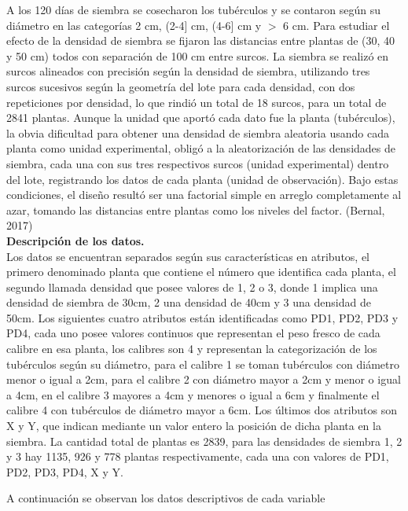 A los 120 días de siembra se cosecharon los tubérculos y se contaron según su diámetro en las categorías 2 cm, (2-4] cm, (4-6] cm y $>$ 6 cm. Para estudiar el efecto de la densidad de siembra se fijaron las distancias entre plantas de (30, 40 y 50 cm) todos con separación de 100 cm entre surcos. La siembra se realizó en surcos alineados con precisión según la densidad de siembra, utilizando tres surcos sucesivos según la geometría del lote para cada densidad, con dos repeticiones por densidad, lo que rindió un total de 18 surcos, para un total de 2841 plantas. Aunque la unidad que aportó cada dato fue la planta (tubérculos), la obvia dificultad para obtener una densidad de siembra aleatoria usando cada planta como unidad experimental, obligó a la aleatorización de las densidades de siembra, cada una con sus tres respectivos surcos (unidad experimental) dentro del lote, registrando los datos de cada planta (unidad de observación). Bajo estas condiciones, el diseño resultó ser una factorial simple en arreglo completamente al azar, tomando las distancias entre plantas como los niveles del factor. (Bernal, 2017)\\

\noindent
\textbf{Descripción de los datos.}\\

Los datos se encuentran separados según sus características en atributos, el primero denominado planta que contiene el número que identifica cada planta, el segundo llamada densidad que posee valores de 1, 2 o 3, donde 1 implica una densidad de siembra de 30cm, 2 una densidad de 40cm y 3 una densidad de 50cm. Los siguientes cuatro atributos están identificadas como PD1, PD2, PD3 y PD4, cada uno posee valores continuos que representan el peso fresco de cada calibre en esa planta, los calibres son 4 y representan la categorización de los tubérculos según su diámetro, para el calibre 1 se toman tubérculos con diámetro menor o igual a 2cm, para el calibre 2 con diámetro mayor a 2cm y menor o igual a 4cm, en el calibre 3 mayores a 4cm y menores o igual a 6cm y finalmente el calibre 4 con tubérculos de diámetro mayor a 6cm. Los últimos dos atributos son X y Y, que indican mediante un valor entero la posición de dicha planta en la siembra. La cantidad total de plantas es 2839, para las densidades de siembra 1, 2 y 3 hay 1135, 926 y 778 plantas respectivamente, cada una con valores de PD1, PD2, PD3, PD4, X y Y.

A continuación se observan los datos descriptivos de cada variable

